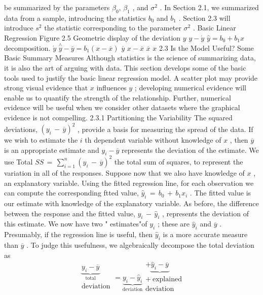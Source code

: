 \documentclass[11pt]{article}
\begin{document}
 be summarized by the parameters \(\beta_{0} , \, \beta_{1}\) , and \(\sigma^{2}\) . In Section 2.1, we summarized
 data from a sample, introducing the statistics \(b_{0}\) and \(b_{1}\) . Section 2.3 will introduce
\(s^{2}\) the statistic corresponding to the parameter \(\sigma^{2}\) .
 Basic Linear Regression
Figure 2.5
Geometric display of
the deviation \(y\) \(y-\acute{y}\) \(\hat{y}=b_{0}+b_{1} x\)
decomposition.
\(\acute{y}\)
\(\overset{\wedge} {y} \!-\! \overline{{y}}=b_{1} ( x \!-\! \overline{{x}} )\)
\(\overline{{y}}\) \(x-\overline{{x}}\)
\(\overline{{x}}\) \(x\)
 2.3 Is the Model Useful? Some Basic Summary Measures
Although statistics is the science of summarizing data, it is also the art of arguing
with data. This section develops some of the basic tools used to justify the basic
 linear regression model. \(\mathrm{A}\) scatter plot may provide strong visual evidence that
\(x\) influences \(y\) ; developing numerical evidence will enable us to quantify the
strength of the relationship. Further, numerical evidence will be useful when we
consider other datasets where the graphical evidence is not compelling.
2.3.1 Partitioning the Variability
The squared deviations, \(( y_{i} \,-\, \overline{{y}} )^{2}\) , provide a basis for measuring the spread of
the data. If we wish to estimate the \(i\) th dependent variable without knowledge
of \(x\) , then \(\overline{{y}}\) is an appropriate estimate and \(y_{i}-\overline{{y}}\) represents the deviation of
the estimate. We use Total \(S S \,=\, \sum_{i=1}^{n} \left( y_{i} \,-\, \overline{{y}} \right)^{2}\) the total sum of squares, to
represent the variation in all of the responses.
 Suppose now that we also have knowledge of \(x\) , an explanatory variable. Using
 the fitted regression line, for each observation we can compute the corresponding
ftted value, \(\widehat{y}_{i} \,=\, b_{0} \,+\, b_{1} x_{i}\) . The fitted value is our estimate with knowledge of
the explanatory variable. As before, the difference between the response and
the fitted value, \(y_{i} \,-\, \widehat{y}_{i}\) , represents the deviation of this estimate. We now have
two " estimates"of \(y_{i}\) ; these are \(\widehat{y}_{i}\) and \(\overline{{y}}\) . Presumably, if the regression line is
useful, then \(\widehat{y}_{i}\) is a more accurate measure than \(\overline{{y}}\) . To judge this usefulness, we
 algebraically decompose the total deviation as
\[
\begin{array} {c} {\underbrace{y_{i}-\overline{{y}}}_{\mathrm{t o t a l}}} \\ {\mathrm{d e v i a t i o n}} \\ \end{array}=\underbrace{y_{i}-\widehat{y}_{i}}_{\mathrm{d e v i a t i o n}} \begin{array} {c} {+\underbrace{\widehat{y}_{i}-\overline{{y}}}} \\ {+\ \mathrm{e x p l a i n e d}} \\ {\mathrm{d e v i a t i o n}} \\ \end{array} \tag{2.1}
\]
\end{document}
